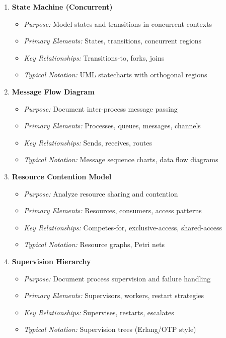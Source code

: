\documentclass[11pt,letterpaper]{article}
\begin{document}
\begin{enumerate}[label=\textbf{MT\arabic*:}, leftmargin=2.5em]
    \item \textbf{State Machine (Concurrent)}
    \begin{itemize}[nosep]
        \item \textit{Purpose:} Model states and transitions in concurrent contexts
        \item \textit{Primary Elements:} States, transitions, concurrent regions
        \item \textit{Key Relationships:} Transitions-to, forks, joins
        \item \textit{Typical Notation:} UML statecharts with orthogonal regions
    \end{itemize}
    
    \item \textbf{Message Flow Diagram}
    \begin{itemize}[nosep]
        \item \textit{Purpose:} Document inter-process message passing
        \item \textit{Primary Elements:} Processes, queues, messages, channels
        \item \textit{Key Relationships:} Sends, receives, routes
        \item \textit{Typical Notation:} Message sequence charts, data flow diagrams
    \end{itemize}
    
    \item \textbf{Resource Contention Model}
    \begin{itemize}[nosep]
        \item \textit{Purpose:} Analyze resource sharing and contention
        \item \textit{Primary Elements:} Resources, consumers, access patterns
        \item \textit{Key Relationships:} Competes-for, exclusive-access, shared-access
        \item \textit{Typical Notation:} Resource graphs, Petri nets
    \end{itemize}
    
    \item \textbf{Supervision Hierarchy}
    \begin{itemize}[nosep]
        \item \textit{Purpose:} Document process supervision and failure handling
        \item \textit{Primary Elements:} Supervisors, workers, restart strategies
        \item \textit{Key Relationships:} Supervises, restarts, escalates
        \item \textit{Typical Notation:} Supervision trees (Erlang/OTP style)
    \end{itemize}
    

\end{enumerate}
\end{document}
